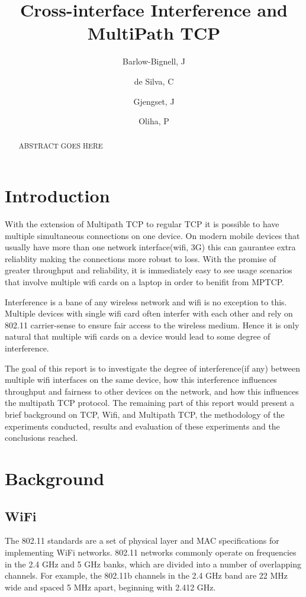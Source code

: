 \documentclass[12pt,a4paper]{article}
\title{Cross-interface Interference and MultiPath TCP}
\author{Barlow-Bignell, J}
\author{de Silva, C}
\author{Gjengset, J}
\author{Oliha, P}
\affil{University College London}
\date{}
\begin{document}
\maketitle

\begin{abstract}
  ABSTRACT GOES HERE
\end{abstract}
\clearpage

\section{Introduction}
With the extension of Multipath TCP to regular TCP it is possible to have
multiple simultaneous connections on one device. On modern mobile devices that
usually have more than one network interface(wifi, 3G) this can gaurantee extra
reliablity making the connections more robust to loss. With the promise of
greater throughput and reliability, it is immediately easy to see usage
scenarios that involve  multiple wifi cards on a laptop in order to benifit from
MPTCP.

Interference is a bane of any wireless network and wifi is no exception to this.
Multiple devices with single wifi card often interfer with each other and rely
on 802.11 carrier-sense to ensure fair access to the wireless medium. Hence it
is only natural that multiple wifi cards on a device would lead to some degree
of interference.

The goal of this report is to investigate the degree of interference(if any)
between multiple wifi interfaces on the same device, how this interference
influences throughput and fairness to other devices on the network, and how this
influences the multipath TCP protocol. The remaining part of this report would
present a brief background on TCP, Wifi, and Multipath TCP, the methodology of
the experiments conducted, results and evaluation of these experiments and the
conclusions reached.

\section{Background}
\subsection{WiFi}
The 802.11 standards are a set of physical layer and MAC specifications for
implementing WiFi networks.  802.11 networks commonly operate on frequencies in
the 2.4 GHz and 5 GHz banks, which are divided into a number of overlapping
channels. For example, the 802.11b channels in the 2.4 GHz band are 22 MHz wide
and spaced 5 MHz apart, beginning with 2.412 GHz.
\end{document}
